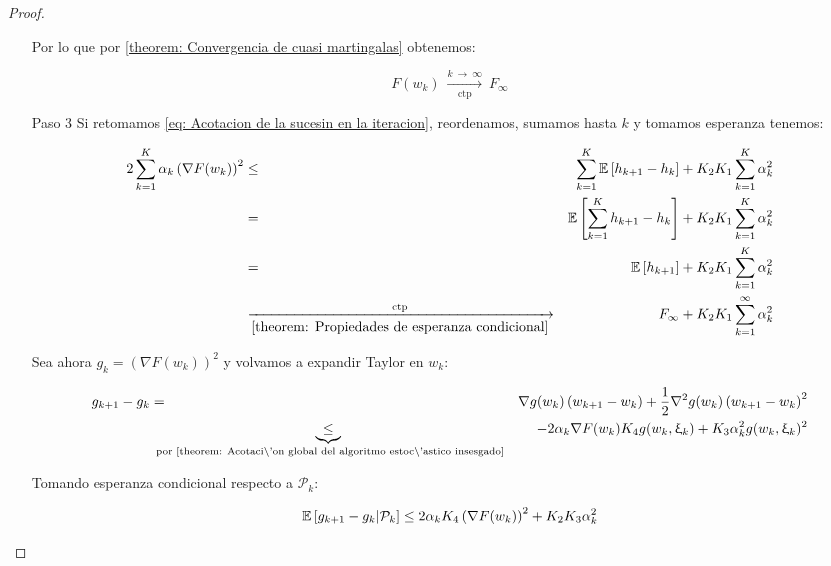 \begin{proof}
\begin{enumerate}
		  Por lo que por \ref{theorem: Convergencia de cuasi martingalas} obtenemos:
		 
		 \begin{equation}
		 F(w_k) \ \xrightarrow[\text{ctp}]{k \ \rightarrow \ \infty } \ F_{\infty}
		 \end{equation}
		 
		 \item[Paso 3] Si retomamos \ref{eq: Acotacion de la sucesin en la iteracion}, reordenamos, sumamos hasta $k$ y tomamos esperanza tenemos: 
		 
		 \begin{equation}
		 \label{eq: los gradientes ponderados son sumables en caso no convexo ctp}
		 	\begin{aligned}
		 	2\sum\limits_{k=1}^{K} {\alpha_k \left(\nabla F(w_k)\right)^2} & \leq & \sum\limits_{k=1}^{K} {\mathbb{E} \left[h_{k+1} - h_k\right]} + K_2K_1 \sum\limits_{k=1}^{K} {\alpha_k^2} \\
		 	& = & \mathbb{E} \left[\sum\limits_{k=1}^{K} {h_{k+1} - h_k}\right] + K_2K_1 \sum\limits_{k=1}^{K} {\alpha_k^2} \\
		 	& = & \mathbb{E} \left[h_{k+1}\right] + K_2K_1 \sum\limits_{k=1}^{K} {\alpha_k^2} \\
		 	& \xrightarrow[\ref{theorem: Propiedades de esperanza condicional}]{\text{ ctp }} & F_{\infty} + K_2K_1 \sum\limits_{k=1}^{\infty} {\alpha_k^2}
		 	\end{aligned}
		 \end{equation}
		 
		 Sea ahora $g_k = \left(\nabla F (w_k)\right)^2$ y volvamos a expandir Taylor en $w_k$:
		 
		 \begin{equation*}
		 \begin{aligned}
		 g_{k+1} - g_k & = & \nabla g(w_k) \left(w_{k+1} - w_k\right) + \frac{1}{2} \nabla^2 g(w_k) \left(w_{k+1} - w_k\right)^2 \\
		 &\underbrace{\leq}_{\text{ por \ref{theorem: Acotaci\'on global del algoritmo estoc\'astico insesgado}}} & - 2 \alpha_k \nabla F(w_k) K_4 g(w_k, \upxi_{k}) + K_3 \alpha_k^2 g(w_k, \upxi_{k})^2 \\
		 \end{aligned}
		 \end{equation*}
		 
		 Tomando esperanza condicional respecto a $\mathcal{P}_k$:
		 
		 \begin{equation}
		 	\mathbb{E} \left[{g_{k+1} - g_k } \vert \mathcal{P}_{k}\right] \leq 2 \alpha_k K_4 \left(\nabla F(w_k)\right)^2 + K_2K_3\alpha_k^2
		 \end{equation}
		 

\end{enumerate}
\end{proof}
